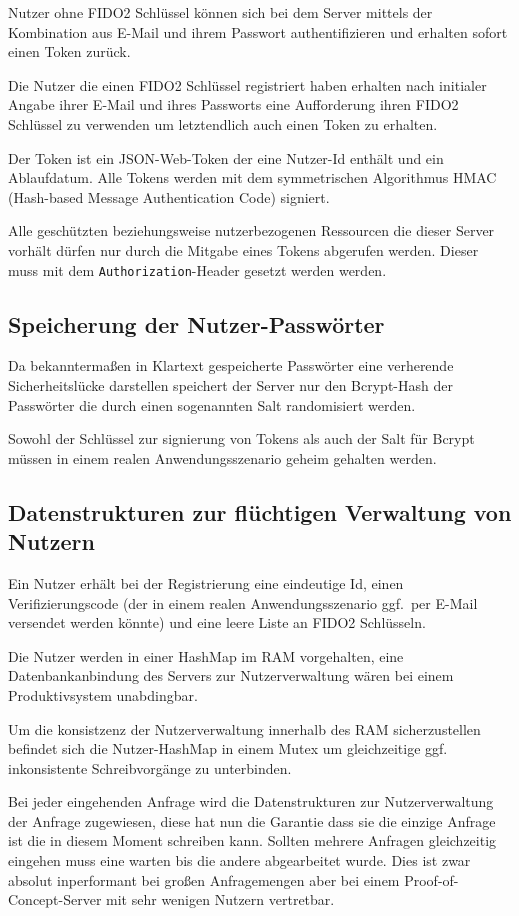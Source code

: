 \documentclass[journal]{IEEEtran}
\begin{document}
Nutzer ohne FIDO2 Schlüssel können sich bei dem Server mittels der Kombination
aus E-Mail und ihrem Passwort authentifizieren und erhalten sofort einen Token
zurück.

Die Nutzer die einen FIDO2 Schlüssel registriert haben erhalten nach
initialer Angabe ihrer E-Mail und ihres Passworts eine Aufforderung ihren FIDO2
Schlüssel zu verwenden um letztendlich auch einen Token zu erhalten.

Der Token ist ein JSON-Web-Token der eine Nutzer-Id enthält und ein
Ablaufdatum. Alle Tokens werden mit dem symmetrischen Algorithmus HMAC
(Hash-based Message Authentication Code) signiert.

Alle geschützten beziehungsweise nutzerbezogenen Ressourcen die dieser Server
vorhält dürfen nur durch die Mitgabe eines Tokens abgerufen werden. Dieser muss
mit dem \texttt{Authorization}-Header gesetzt werden werden.

\subsection{Speicherung der Nutzer-Passwörter}

Da bekanntermaßen in Klartext gespeicherte Passwörter eine verherende
Sicherheitslücke darstellen speichert der Server nur den Bcrypt-Hash der
Passwörter die durch einen sogenannten Salt randomisiert werden.

Sowohl der Schlüssel zur signierung von Tokens als auch der Salt für Bcrypt
müssen in einem realen Anwendungsszenario geheim gehalten werden.

\subsection{Datenstrukturen zur flüchtigen Verwaltung von Nutzern}

Ein Nutzer erhält bei der Registrierung eine eindeutige Id, einen
Verifizierungscode (der in einem realen Anwendungsszenario ggf.\ per E-Mail
versendet werden könnte) und eine leere Liste an FIDO2 Schlüsseln.

Die Nutzer werden in einer HashMap im RAM vorgehalten, eine Datenbankanbindung
des Servers zur Nutzerverwaltung wären bei einem Produktivsystem unabdingbar.

Um die konsistzenz der Nutzerverwaltung innerhalb des RAM sicherzustellen
befindet sich die Nutzer-HashMap in einem Mutex um gleichzeitige ggf.
inkonsistente Schreibvorgänge zu unterbinden.

Bei jeder eingehenden Anfrage wird die Datenstrukturen zur Nutzerverwaltung der
Anfrage zugewiesen, diese hat nun die Garantie dass sie die einzige Anfrage ist
die in diesem Moment schreiben kann. Sollten mehrere Anfragen gleichzeitig
eingehen muss eine warten bis die andere abgearbeitet wurde. Dies ist zwar
absolut inperformant bei großen Anfragemengen aber bei einem
Proof-of-Concept-Server mit sehr wenigen Nutzern vertretbar.
\end{document}
